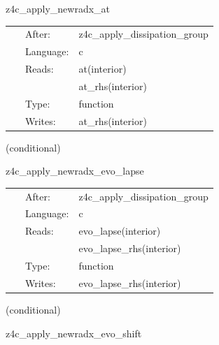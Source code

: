 \hspace{5mm} z4c\_apply\_newradx\_at 



\hspace{5mm}

 \begin{tabular*}{160mm}{cll} 
~ & After:  & z4c\_apply\_dissipation\_group \\ 
~ & Language:  & c \\ 
~ & Reads:  & at(interior) \\ 
~& ~ &at\_rhs(interior)\\ 
~ & Type:  & function \\ 
~ & Writes:  & at\_rhs(interior) \\ 
\end{tabular*} 


\vspace{5mm}

   (conditional) 

\hspace{5mm} z4c\_apply\_newradx\_evo\_lapse 



\hspace{5mm}

 \begin{tabular*}{160mm}{cll} 
~ & After:  & z4c\_apply\_dissipation\_group \\ 
~ & Language:  & c \\ 
~ & Reads:  & evo\_lapse(interior) \\ 
~& ~ &evo\_lapse\_rhs(interior)\\ 
~ & Type:  & function \\ 
~ & Writes:  & evo\_lapse\_rhs(interior) \\ 
\end{tabular*} 


\vspace{5mm}

   (conditional) 

\hspace{5mm} z4c\_apply\_newradx\_evo\_shift 

